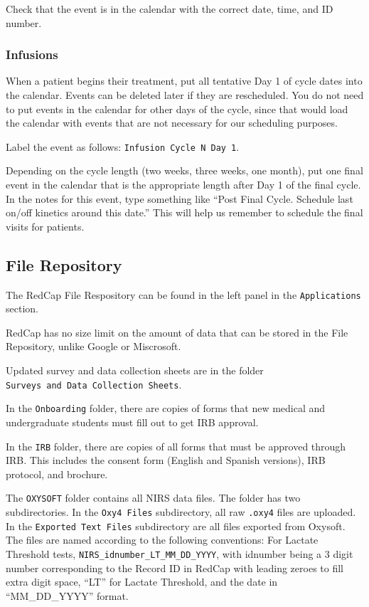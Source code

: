 \documentclass[
]{book}
\begin{document}
Check that the event is in the calendar with the correct date, time, and ID number.

\hypertarget{RedCap-Calendar-Infusions}{%
\subsubsection{Infusions}\label{RedCap-Calendar-Infusions}}

When a patient begins their treatment, put all tentative Day 1 of cycle dates into the calendar. Events can be deleted later if they are rescheduled. You do not need to put events in the calendar for other days of the cycle, since that would load the calendar with events that are not necessary for our scheduling purposes.

Label the event as follows: \texttt{Infusion\ Cycle\ N\ Day\ 1}.

Depending on the cycle length (two weeks, three weeks, one month), put one final event in the calendar that is the appropriate length after Day 1 of the final cycle. In the notes for this event, type something like ``Post Final Cycle. Schedule last on/off kinetics around this date.'' This will help us remember to schedule the final visits for patients.

\hypertarget{RedCap-FileRepository}{%
\subsection{File Repository}\label{RedCap-FileRepository}}

The RedCap File Respository can be found in the left panel in the \texttt{Applications} section.

RedCap has no size limit on the amount of data that can be stored in the File Repository, unlike Google or Miscrosoft.

Updated survey and data collection sheets are in the folder \texttt{Surveys\ and\ Data\ Collection\ Sheets}.

In the \texttt{Onboarding} folder, there are copies of forms that new medical and undergraduate students must fill out to get IRB approval.

In the \texttt{IRB} folder, there are copies of all forms that must be approved through IRB. This includes the consent form (English and Spanish versions), IRB protocol, and brochure.

The \texttt{OXYSOFT} folder contains all NIRS data files. The folder has two subdirectories.
In the \texttt{Oxy4\ Files} subdirectory, all raw \texttt{.oxy4} files are uploaded. In the \texttt{Exported\ Text\ Files} subdirectory are all files exported from Oxysoft.
The files are named according to the following conventions:
For Lactate Threshold tests, \texttt{NIRS\_idnumber\_LT\_MM\_DD\_YYYY}, with idnumber being a 3 digit number corresponding to the Record ID in RedCap with leading zeroes to fill extra digit space, ``LT'' for Lactate Threshold, and the date in ``MM\_DD\_YYYY'' format.
\end{document}

